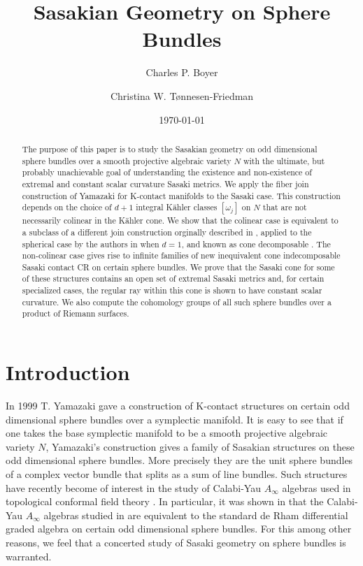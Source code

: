 \documentclass[12pt]{amsart}
\title{Sasakian Geometry on Sphere Bundles}
\author{Charles P. Boyer}
\author{Christina W. T{\o}nnesen-Friedman}
\date{\today}
\def\gro{\omega}
\begin{document}
\begin{abstract}
The purpose of this paper is to study the Sasakian geometry on odd dimensional sphere bundles over a smooth projective algebraic variety $N$ with the ultimate, but probably unachievable goal of understanding the existence and non-existence of extremal and constant scalar curvature Sasaki metrics. We apply the fiber join construction of Yamazaki \cite{Yam99} for K-contact manifolds to the Sasaki case. This construction depends on the choice of $d+1$ integral K\"ahler classes $[\gro_j]$ on $N$ that are not necessarily colinear in the K\"ahler cone. We show that the colinear case is equivalent to a subclass of a different join construction orginally described in \cite{BG00a,BGO06}, applied to the spherical case by the authors in \cite{BoTo13,BoTo14a} when $d=1$, and known as cone decomposable \cite{BHLT16}.
The non-colinear case gives rise to infinite families of new inequivalent cone indecomposable Sasaki contact CR on certain sphere bundles. We prove that the Sasaki cone for some of these structures contains an open set of extremal Sasaki metrics and, for certain specialized cases, the regular ray within this cone is shown to have constant scalar curvature. We also compute the cohomology groups of all such sphere bundles over a product of Riemann surfaces.
\end{abstract}






\maketitle



\tableofcontents

\section{Introduction}
In 1999 T. Yamazaki \cite{Yam99} gave a construction of K-contact structures on certain odd dimensional sphere bundles over a symplectic manifold. It is easy to see that if one takes the base symplectic manifold to be a smooth projective algebraic variety $N$, Yamazaki's construction gives a family of Sasakian structures on these odd dimensional sphere bundles. More precisely they are the unit sphere bundles of a complex vector bundle that splits as a sum of line bundles. Such structures have recently become of interest in the study of Calabi-Yau $A_\infty$ algebras used in topological conformal field theory \cite{Cos07}. In particular, it was shown in  \cite{TaTs17} that the Calabi-Yau $A_\infty$ algebras studied in \cite{TsTsYau16} are equivalent to the standard de Rham differential graded algebra on certain odd dimensional sphere bundles. For this among other reasons, we feel that a concerted study of Sasaki geometry on sphere bundles is warranted. 
\end{document}
